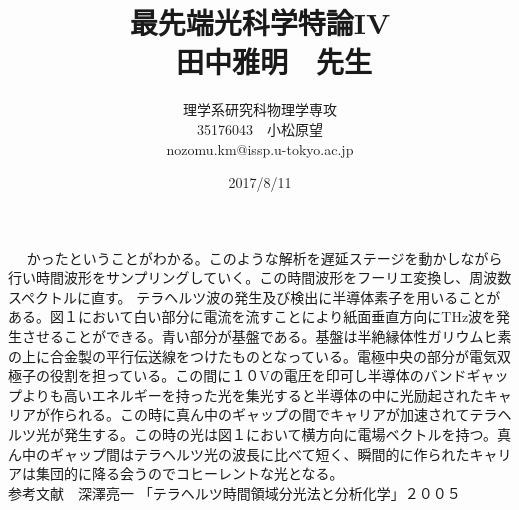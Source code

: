 \documentclass{jsarticle}
\title{最先端光科学特論IV\\　田中雅明　先生}
\author{理学系研究科物理学専攻\\35176043　小松原望\\nozomu.km@issp.u-tokyo.ac.jp}
\date{2017/8/11}
\begin{document}
\maketitle　%
かったということがわかる。このような解析を遅延ステージを動かしながら行い時間波形をサンプリングしていく。この時間波形をフーリエ変換し、周波数スペクトルに直す。
\quad テラヘルツ波の発生及び検出に半導体素子を用いることがある。図１において白い部分に電流を流すことにより紙面垂直方向にTHz波を発生させることができる。青い部分が基盤である。基盤は半絶縁体性ガリウムヒ素の上に合金製の平行伝送線をつけたものとなっている。電極中央の部分が電気双極子の役割を担っている。この間に１０Vの電圧を印可し半導体のバンドギャップよりも高いエネルギーを持った光を集光すると半導体の中に光励起されたキャリアが作られる。この時に真ん中のギャップの間でキャリアが加速されてテラヘルツ光が発生する。この時の光は図１において横方向に電場ベクトルを持つ。真ん中のギャップ間はテラヘルツ光の波長に比べて短く、瞬間的に作られたキャリアは集団的に降る会うのでコヒーレントな光となる。\\
参考文献　深澤亮一 「テラヘルツ時間領域分光法と分析化学」２００５
\end{document}
